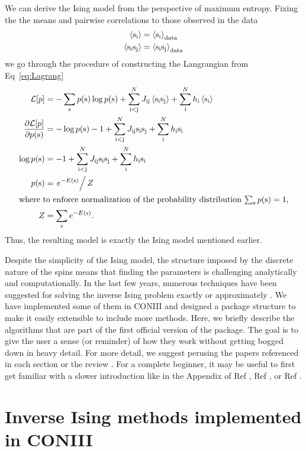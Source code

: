 \documentclass[aps,prl,twocolumn,nofootinbib]{revtex4-1}
\begin{document}
We can derive the Ising model from the perspective of maximum entropy. Fixing the the means and pairwise correlations to those observed in the data
\begin{align}
	\left<{\rm s}_{\rm i}\right> &= \left<{\rm s}_{\rm i}\right>_{\rm data} \\
	\left<{\rm s}_{\rm i}{\rm s}_{\rm j}\right> &= \left<{\rm s}_{\rm i}{\rm s}_{\rm j}\right>_{\rm data}
\end{align}
we go through the procedure of constructing the Langrangian from Eq~\ref{eq:Lagrang}
\begin{align}
	\mathcal{L}[p] &= -\sum_{\rm s} p({\rm s})\log p({\rm s}) +\sum_{\rm i<j}^N J_{\rm ij}\left<{\rm s}_{\rm i}{\rm s}_{\rm j}\right> +\sum_{\rm i}^Nh_{\rm i}\left<{\rm s}_{\rm i}\right>\\
	\frac{\partial\mathcal{L}[p]}{\partial p({\rm s})} &= -\log p({\rm s})-1 +\sum_{\rm i<j}^N J_{\rm ij}{\rm s}_{\rm i}{\rm s}_{\rm j} +\sum_{\rm i}^Nh_{\rm i}{\rm s}_{\rm i}\\
	\log p({\rm s}) &= -1 +\sum_{\rm i<j}^N J_{\rm ij}{\rm s}_{\rm i}{\rm s}_{\rm j} +\sum_{\rm i}^Nh_{\rm i}{\rm s}_{\rm i}\\
	p({\rm s}) &= \left.e^{-E({\rm s})}\right/Z\\
\intertext{where to enforce normalization of the probability distribution $\sum_{\rm s} p({\rm s}) = 1$,}
	Z &= \sum_{{\rm s}} e^{-E({\rm s})}.
\end{align}
Thus, the resulting model is exactly the Ising model mentioned earlier.

Despite the simplicity of the Ising model, the structure imposed by the discrete nature of the spins means that finding the parameters is challenging analytically and computationally. In the last few years, numerous techniques have been suggested for solving the inverse Ising problem exactly or approximately \cite{Nguyen:2017ww}. We have implemented some of them in CONIII and designed a package structure to make it easily extensible to include more methods.  Here, we briefly describe the algorithms that are part of the first official version of the package. The goal is to give the user a sense (or reminder) of how they work without getting bogged down in heavy detail. For more detail, we suggest perusing the papers referenced in each section or the review \cite{Nguyen:2017ww}. For a complete beginner, it may be useful to first get familiar with a slower introduction like in the Appendix of Ref \cite{Lee:2015ev}, Ref \cite{Bialek:2012ueb}, or Ref \cite{Bretthorst:2003ua}.



\section{Inverse Ising methods implemented in CONIII}
\end{document}
